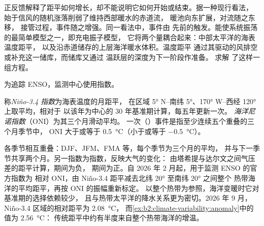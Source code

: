 正反馈解释了距平如何增长，却不能说明它如何开始或结束。据一种现行看法，
始于信风的随机涨落削弱了维持西部暖水的赤道流，
暖池向东扩展，对流随之东移，
接管过程，事件随之增强。同一看法中，事件由
先前的触发。能使系统振荡的最简单模型之一，即充电振子模型，
它将两个量耦合起来：中部太平洋的海表温度距平，
以及沿赤道储存的上层海洋暖水体积。温度距平
通过其驱动的风排空或补充这一储库，而储库又通过
温跃层的深度为下一阶段作准备。 求解
了这样一组方程。

为追踪 ENSO，监测中心使用指数。

\begin{definition}\label{def:b2:climate-variability:oni}
称\emph{Niño-3.4 指数}为海表温度的月距平，
在区域 \ang{5} N--南纬 \ang{5}、\ang{170} W--西经 \ang{120} 上取平均，相对于
以该年为中心的 30 年基准期计算，每五年更新一次。
\emph{海洋尼诺指数}（ONI）为其三个月滑动平均。
一次（）事件是指至少连续五个重叠的三个月季节中，
ONI 大于或等于 \qty{+0.5}{\celsius}（小于或等于 \qty{-0.5}{\celsius}）。
\end{definition}

各季节相互重叠：DJF、JFM、FMA 等，每个季节为三个月的平均，
并与下一季节共享两个月。另一指数为指数，反映大气的变化：
由塔希提与达尔文之间气压差的距平计算，期间为负，
期间为正。自 2026 年 2 月起，用于监测 ENSO 的官方指数为
相对 ONI，由 Niño-3.4 距平减去北纬 \ang{20} 至南纬 \ang{20} 之间整个
热带海洋的平均距平，再按 ONI 的振幅重新标定。
以整个热带为参照，海洋变暖时它对基准期的选择依赖较少，
且与热带太平洋的降水关系更为密切。2026 年 9 月，
Niño-3.4 区域的相对距平为 \qty{2.08}{\celsius}，
而\cref{ex:b2:climate-variability:anomaly}中的值为 \qty{2.56}{\celsius}：
传统距平中约有半度来自整个热带海洋的增温。


